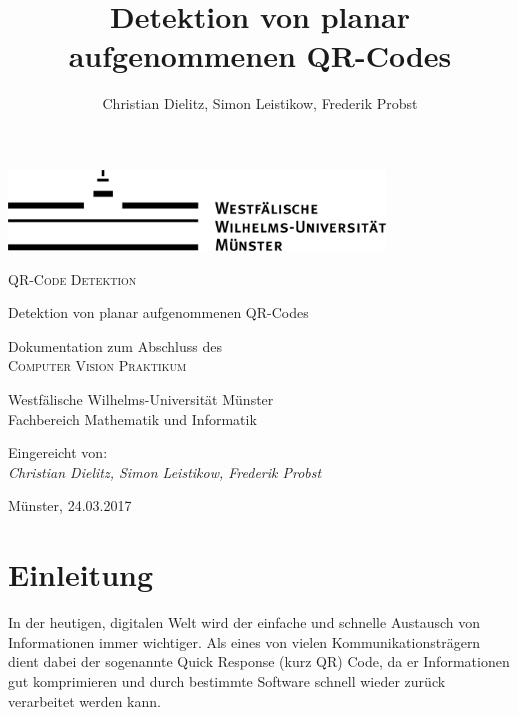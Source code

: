\documentclass[a4paper, oneside, 12pt]{article}
\title{Detektion von planar aufgenommenen QR-Codes}
\author{Christian Dielitz, Simon Leistikow, Frederik Probst}
\begin{document}
\thispagestyle{empty}  %

\hspace*{1em}
\begin{center}
	\includegraphics[width=10cm]{images/wwu_logo}
	\par
	\vspace*{8ex}
	\Huge
	\Large\textsc{QR-Code Detektion}
	
	\vspace{10pt}
	\large Detektion von planar aufgenommenen QR-Codes
	
	\par
	\normalsize
	\vspace*{8ex}
	\normalsize
	Dokumentation zum Abschluss des\\
	\large
	\textsc{Computer Vision Praktikum}
	\par
	\normalsize
	\vspace*{12ex}
	Westfälische Wilhelms-Universität Münster\\
	Fachbereich Mathematik und Informatik\\
\end{center}
\par

\vspace*{34ex}
Eingereicht von:\\
\large
\textit{Christian Dielitz, Simon Leistikow, Frederik Probst}
\par
\normalsize
\vspace*{4ex}
Münster, 24.03.2017
\vfill
\hspace*{1em}



\newpage
\tableofcontents
\listoffigures

\newpage

\section{Einleitung}
\label{s:einleitung}
In der heutigen, digitalen Welt wird der einfache und schnelle Austausch von Informationen immer wichtiger. Als eines von vielen Kommunikationsträgern dient dabei der sogenannte Quick Response (kurz QR) Code, da er Informationen gut komprimieren und durch bestimmte Software schnell wieder zurück verarbeitet werden kann.
\end{document}
